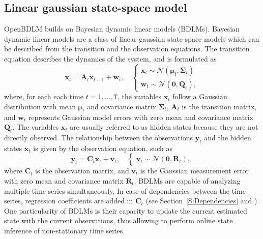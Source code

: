 \subsection{Linear gaussian state-space model}
\label{SS:LGSSM}
OpenBDLM builds on Bayesian dynamic linear models (BDLMs).
Bayesian dynamic linear models \cite{west1999bayesian} are a class of linear gaussian state-space models which can be described from the transition and the observation equations.
The transition equation describes the dynamics of the system, and is formulated as
\begin{equation}
  \mathbf{x}_{t}=\mathbf{A}_{t}\mathbf{x}_{t-1}+\mathbf{w}_{t},\quad\left\{
  \begin{array}{l}
\mathbf{x}_{t}\sim \mathcal{N}(\bm{\mu}_{t},\bm{\Sigma}_{t})\\[4pt]
\mathbf{w}_{t}\sim \mathcal{N}(\mathbf{0},
\mathbf{Q}_{t}),
\end{array}\right.
\label{EQ:SSM_Transition}
\end{equation}
where, for each each time $t=1, \dots ,\mathtt{T}$, the variables $\mathbf{x}_{t}$ follow a Gaussian distribution with mean $\bm{\mu}_{t}$ and covariance matrix $\bm{\Sigma}_{t}$, $\mathbf{A}_{t}$ is the transition matrix, and $\mathbf{w}_{t}$ represents Gaussian model errors with zero mean and covariance matrix $\mathbf{Q}_{t}$.
The variables $\mathbf{x}_{t}$ are usually referred to as hidden states because they are not directly observed.
The relationship between the observations $\mathbf{y}_{t}$ and the hidden states $\mathbf{x}_{t}$ is given by the observation equation, such as
\begin{equation}
\mathbf{y}_{t}=\mathbf{C}_{t}\mathbf{x}_{t}+\mathbf{v}_{t},\quad\left\{\begin{array}{l}
\mathbf{v}_{t}\sim \mathcal{N}(\mathbf{0},\mathbf{R}_{t}),
\end{array}\right.
\label{EQ:SSM_Observation}
\end{equation}
where $\mathbf{C}_{t}$ is the observation matrix, and $\mathbf{v}_{t}$ is the Gaussian measurement error with zero mean and covariance matrix $\mathbf{R}_{t}$.
BDLMs are capable of analyzing multiple time series simultaneously.
In case of dependencies between the time series, regression coefficients are added in $\mathbf{C}_{t}$ (see Section~\ref{S:Dependencies} and \cite{STC:STC2035}).
One particularity of BDLMs is their capacity to update the current estimated state with the current observations, thus allowing to perform online state inference of non-stationary time series.

